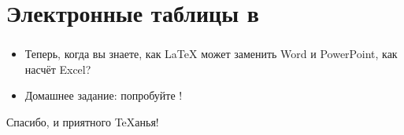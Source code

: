 \documentclass[usenames,dvipsnames]{beamer}
\begin{document}
\section{Электронные таблицы в \protect{}}

\begin{frame}[fragile]
\frametitle{\insertsection}
\begin{itemize}
\item Теперь, когда вы знаете, как \LaTeX{} может заменить Word и PowerPoint,
как насчёт Excel?
\item Домашнее задание: попробуйте
!
\end{itemize}
\end{frame}

\begin{frame}
\begin{center}
Спасибо, и приятного \TeX{}анья!
\end{center}
\end{frame}
\end{document}
